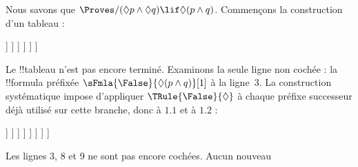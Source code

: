 \documentclass[../../../include/open-logic-section]{subfiles}
\begin{document}
{
\begin{ex}
  Nous savons que $\Proves/ (\Diamond p \land \Diamond q) \lif \Diamond(p
  \land q)$. Commençons la construction d'un tableau :
  \begin{oltableau}
    [\pFmla{\False}{(\Diamond p \land \Diamond q) \lif \Diamond(p \land q)}{1},
      just = \TAss, checked
      [\pFmla{\True}{\Diamond p \land \Diamond q}{1},
        just = {\TRule{\False}{\lif}[1]}, checked
        [\pFmla{\False}{\Diamond(p \land q)}{1},
          just = {\TRule{\False}{\lif}[1]}
          [\pFmla{\True}{\Diamond p}{1},
            just = {\TRule{\True}{\land}[2]}, checked
            [\pFmla{\True}{\Diamond q}{1},
              just = {\TRule{\True}{\land}[2]}, checked
              [\pFmla{\True}{p}{1.1}, 
                just = {\TRule{\True}{\Diamond}[4]}, checked
                [\pFmla{\True}{q}{1.2}, 
                  just = {\TRule{\True}{\Diamond}[5]}, checked
                ]
              ]
            ]
          ]
        ]
      ]
    ]
  \end{oltableau}
  Le !!{tableau} n'est pas encore terminé. Examinons la seule ligne
  non cochée : la !!{formula} préfixée
  $\sFmla{\False}{\Diamond(p \land q)}[1]$ à la ligne~$3$. La
  construction systématique impose d'appliquer
  $\TRule{\False}{\Diamond}$ à chaque préfixe successeur déjà utilisé
  sur cette branche, donc à $1.1$ et à $1.2$ :
  \begin{oltableau}
    [\pFmla{\False}{(\Diamond p \land \Diamond q) \lif \Diamond(p \land q)}{1},
      just = \TAss, checked
      [\pFmla{\True}{\Diamond p \land \Diamond q}{1},
        just = {\TRule{\False}{\lif}[1]}, checked
        [\pFmla{\False}{\Diamond (p \land q)}{1},
          just = {\TRule{\False}{\lif}[1]}
          [\pFmla{\True}{\Diamond p}{1},
            just = {\TRule{\True}{\land}[2]}, checked
            [\pFmla{\True}{\Diamond q}{1},
              just = {\TRule{\True}{\land}[2]}, checked
              [\pFmla{\True}{p}{1.1}, 
                just = {\TRule{\True}{\Diamond}[4]}, checked
                [\pFmla{\True}{q}{1.2}, 
                  just = {\TRule{\True}{\Diamond}[5]}, checked
                  [\pFmla{\False}{p \land q}{1.1}, 
                    just = {\TRule{\False}{\Diamond}[3]}
                    [\pFmla{\False}{p \land q}{1.2}, 
                      just = {\TRule{\False}{\Diamond}[3]}
                    ]
                  ]
                ]
              ]
            ]
          ]
        ]
      ]
    ]
  \end{oltableau}
  Les lignes 3, 8 et 9 ne sont pas encore cochées. Aucun nouveau

\end{ex}}
\end{document}
